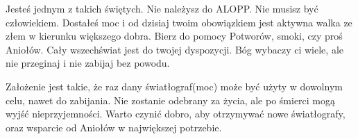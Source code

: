 Jesteś jednym z takich świętych. Nie należysz do ALOPP. Nie musisz być człowiekiem.
Dostałeś moc i od dzisiaj twoim obowiązkiem jest aktywna walka ze złem w kierunku większego dobra.
Bierz do pomocy Potworów, smoki, czy proś Aniołów. Cały wszechświat jest do twojej dyspozycji.
Bóg wybaczy ci wiele, ale nie przeginaj i nie zabijaj bez powodu.

Założenie jest takie, że raz dany światłograf(moc) może być użyty w dowolnym celu, nawet do zabijania.
Nie zostanie odebrany za życia, ale po śmierci mogą wyjść nieprzyjemności.
Warto czynić dobro, aby otrzymywać nowe światłografy, oraz wsparcie od Aniołów w największej potrzebie.
